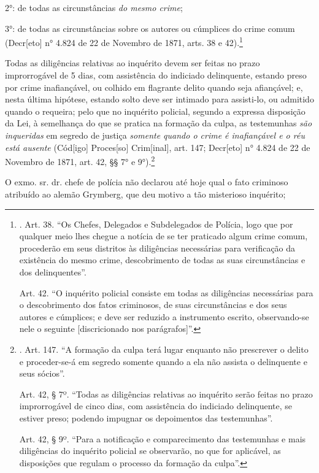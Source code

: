 2°: de todas as circunstâncias \emph{do mesmo crime};

3°: de todas as circunstâncias sobre os autores ou cúmplices do crime
comum (Decr{[}eto{]} n° 4.824 de 22 de Novembro de 1871, arts. 38 e
42).\footnote{. Art. 38. ``Os Chefes, Delegados e Subdelegados de
  Polícia, logo que por qualquer meio lhes chegue a notícia de se ter
  praticado algum crime comum, procederão em seus distritos às
  diligências necessárias para verificação da existência do mesmo crime,
  descobrimento de todas as suas circunstâncias e dos delinquentes''.

  Art. 42. ``O inquérito policial consiste em todas as diligências
  necessárias para o descobrimento dos fatos criminosos, de suas
  circunstâncias e dos seus autores e cúmplices; e deve ser reduzido a
  instrumento escrito, observando-se nele o seguinte {[}discricionado
  nos parágrafos{]}''.}

Todas as diligências relativas ao inquérito devem ser feitas no prazo
improrrogável de 5 dias, com assistência do indiciado delinquente,
estando preso por crime inafiançável, ou colhido em flagrante delito
quando seja afiançável; e, nesta última hipótese, estando solto deve ser
intimado para assisti-lo, ou admitido quando o requeira; pelo que no
inquérito policial, segundo a expressa disposição da Lei, à semelhança
do que se pratica na formação da culpa, as testemunhas \emph{são
inqueridas} em segredo de justiça \emph{somente quando o crime é
inafiançável e o réu está ausente} (Cód{[}igo{]} Proces{[}so{]}
Crim{[}inal{]}, art. 147; Decr{[}eto{]} n° 4.824 de 22 de Novembro de
1871, art. 42, §§ 7° e 9°).\footnote{. Art. 147. ``A formação da culpa
  terá lugar enquanto não prescrever o delito e proceder-se-á em segredo
  somente quando a ela não assista o delinquente e seus sócios''.

  Art. 42, § 7º. ``Todas as diligências relativas ao inquérito serão
  feitas no prazo improrrogável de cinco dias, com assistência do
  indiciado delinquente, se estiver preso; podendo impugnar os
  depoimentos das testemunhas''.

  Art. 42, § 9º. ``Para a notificação e comparecimento das testemunhas e
  mais diligências do inquérito policial se observarão, no que for
  aplicável, as disposições que regulam o processo da formação da
  culpa''.}

O exmo. sr. dr. chefe de polícia não declarou até hoje qual o fato
criminoso atribuído ao alemão Grymberg, que deu motivo a tão misterioso
inquérito;


